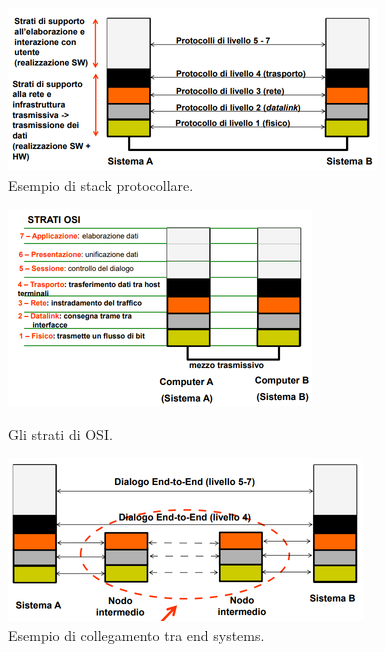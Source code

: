 \documentclass[11pt,a4paper,oneside]{book}
\theoremstyle{definition}
\begin{document}
\begin{figure}[!h]
	\includegraphics[scale=0.7]{Immagini/Protocol_stack.png}
	\centering
	\caption{Esempio di stack protocollare.}
\end{figure}
\begin{figure}[!h]
	\centering
	\begin{minipage}[b]{0.45\textwidth}
		\includegraphics[scale=0.47]{Immagini/Osi_strati.png}
		\caption{Gli strati di OSI.}
	\end{minipage}
	\hfill
	\begin{minipage}[b]{0.45\textwidth}
		\includegraphics[scale=0.47]{Immagini/End_sys.png}
		\caption{Esempio di collegamento tra end systems.}
	\end{minipage}
\end{figure}
\end{document}
